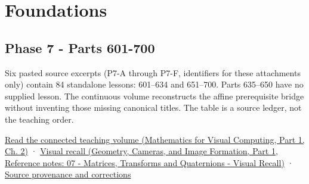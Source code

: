 \hypertarget{appendix-fd090d982a15}{}\label{referencestart:appendix-fd090d982a15}
\section{Foundations}\label{appendix-fd090d982a15-foundations}

\hypertarget{appendix-fd090d982a15-foundations}{}

\subsection{Phase 7 - Parts 601-700}\label{appendix-fd090d982a15-phase-7---parts-601-700}

\hypertarget{appendix-fd090d982a15-phase-7---parts-601-700}{}

Six pasted source excerpts (P7-A through P7-F, identifiers for these attachments only) contain 84 standalone lessons: 601--634 and 651--700. Parts 635--650 have no supplied lesson. The continuous volume reconstructs the affine prerequisite bridge without inventing those missing canonical titles. The table is a source ledger, not the teaching order.

\href{../02-Mathematics-for-Visual-Computing-P01/main.pdf\#01-foundations-i-ch018-keep-the-promises-visible-while-moving-between-representations}{Read the connected teaching volume (Mathematics for Visual Computing, Part 1, Ch. 2)} · \href{../03-Geometry-Cameras-and-Image-Formation-P01/main.pdf\#appendix-68f22c734be3}{Visual recall (Geometry, Cameras, and Image Formation, Part 1, Reference notes: 07 - Matrices, Transforms and Quaternions - Visual Recall)} · \hyperref[appendix-a103e7846d21-phase-7---source-analysis-and-verification]{Source provenance and corrections}

